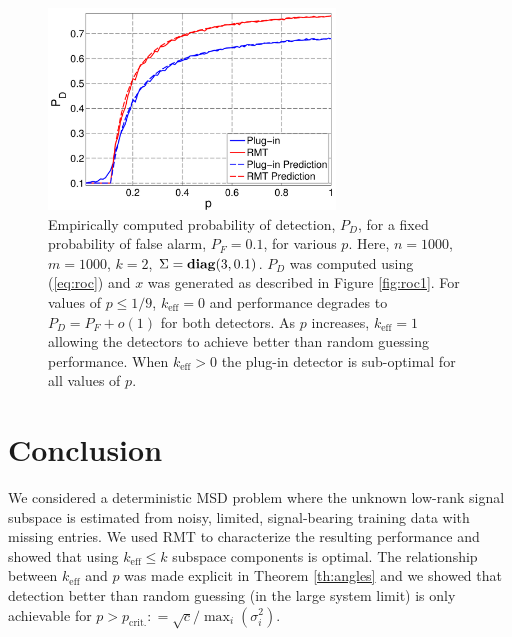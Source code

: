 \begin{figure}[t]
\centering
\includegraphics[width=3in]{figures/sparsity.pdf}
\caption{Empirically computed probability of detection, $P_D$, for a fixed probability of false alarm, $P_F=0.1$, for various $p$. Here, $n=1000$, $m=1000$, $k=2$, $\Sigma=\mathop{\bf diag}(3,0.1)$. $P_D$ was computed using (\ref{eq:roc}) and $x$ was generated as described in Figure \ref{fig:roc1}. For values of $p \leq 1/9$, $k_\text{eff}=0$ and performance degrades to $P_D = P_F +o(1)$ for both detectors. As $p$ increases, $k_\text{eff}=1$ allowing the detectors to achieve better than random guessing performance. When $k_\text{eff}>0$ the plug-in detector is sub-optimal for all values of $p$.}\vskip-0.45cm
\label{fig:sparsity}
\end{figure}

\section{Conclusion}\label{sec:conclusion}

We considered a deterministic MSD problem where the unknown low-rank signal subspace is estimated from noisy, limited, signal-bearing training data with missing entries.  We used RMT to characterize the resulting performance and showed that using $k_\text{eff} \leq k$ subspace components is optimal. The relationship between $k_{\text{eff}}$ and $p$ was made explicit in  Theorem \ref{th:angles} and we showed that detection better than random guessing (in the large system limit) is only achievable for $p > p_{\text{crit.}} : = \sqrt{c}/\max_{i}(\sigma_{i}^{2})$. 